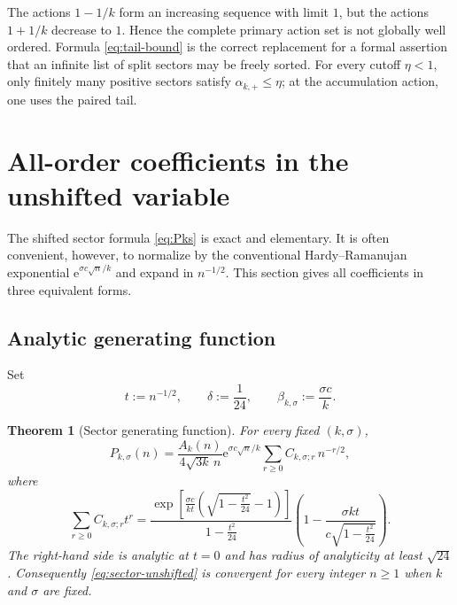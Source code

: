 \documentclass[11pt,a4paper]{article}
\numberwithin{equation}{section}
\newtheorem{theorem}{Theorem}[section]
\theoremstyle{definition}
\theoremstyle{remark}
\newcommand{\e}{\mathrm e}
\begin{document}
\begin{cautionbox}
The actions $1-1/k$ form an increasing sequence with limit $1$, but the actions
$1+1/k$ decrease to $1$.  Hence the complete primary action set is not globally
well ordered.  Formula \eqref{eq:tail-bound} is the correct replacement for a
formal assertion that an infinite list of split sectors may be freely sorted.
For every cutoff $\eta<1$, only finitely many positive sectors satisfy
$\alpha_{k,+}\leq\eta$; at the accumulation action, one uses the paired tail.
\end{cautionbox}

\section{All-order coefficients in the unshifted variable}

The shifted sector formula \eqref{eq:Pks} is exact and elementary.  It is often
convenient, however, to normalize by the conventional Hardy--Ramanujan
exponential $\e^{\sigma c\sqrt n/k}$ and expand in $n^{-1/2}$.  This section
gives all coefficients in three equivalent forms.

\subsection{Analytic generating function}

Set
\begin{equation}\label{eq:t-beta}
 t:=n^{-1/2},\qquad \delta:=\frac1{24},\qquad
 \beta_{k,\sigma}:=\frac{\sigma c}{k}.
\end{equation}

\begin{theorem}[Sector generating function]\label{thm:sector-generating}
For every fixed $(k,\sigma)$,
\begin{equation}\label{eq:sector-unshifted}
 P_{k,\sigma}(n)=
 \frac{A_k(n)}{4\sqrt{3k}\,n}
 \e^{\sigma c\sqrt n/k}
 \sum_{r\geq0}C_{k,\sigma;r}\,n^{-r/2},
\end{equation}
where
\begin{equation}\label{eq:C-generating}
 \boxed{
 \sum_{r\geq0}C_{k,\sigma;r}t^r=
 \frac{\displaystyle
 \exp\!\left[
 \frac{\sigma c}{kt}
 \left(\sqrt{1-\frac{t^2}{24}}-1\right)
 \right]}
 {\displaystyle 1-\frac{t^2}{24}}
 \left(1-
 \frac{\sigma kt}{c\sqrt{1-\frac{t^2}{24}}}
 \right).}
\end{equation}
The right-hand side is analytic at $t=0$ and has radius of analyticity at least
$\sqrt{24}$.  Consequently \eqref{eq:sector-unshifted} is convergent for every
integer $n\geq1$ when $k$ and $\sigma$ are fixed.
\end{theorem}
\end{document}
